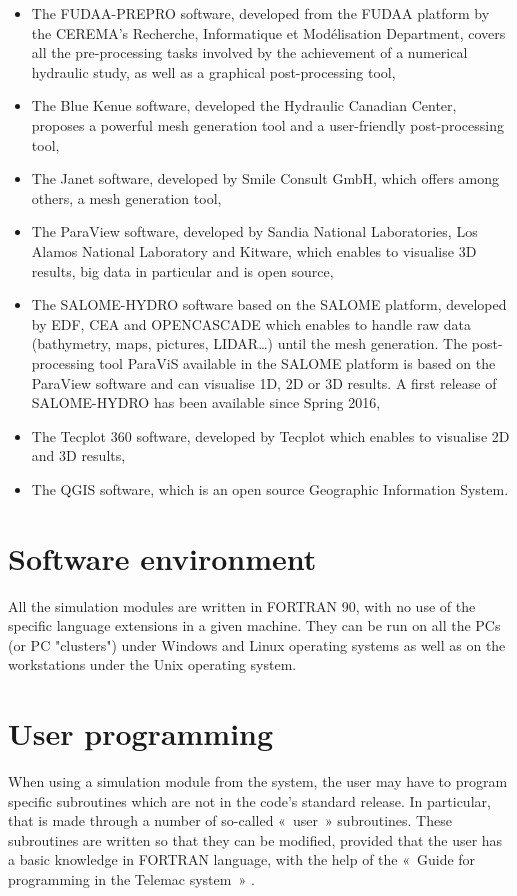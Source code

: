 \begin{itemize}
\item The FUDAA-PREPRO software, developed from the FUDAA platform
by the CEREMA's Recherche, Informatique et Modélisation Department, covers all
the pre-processing tasks involved by the achievement of a numerical hydraulic
study, as well as a graphical post-processing tool,
\item The Blue Kenue software, developed the Hydraulic Canadian
Center, proposes a powerful mesh generation tool and a user-friendly
post-processing tool,
\item The Janet software, developed by Smile Consult GmbH, which offers among
others, a mesh generation tool,
\item The ParaView software, developed by Sandia National Laboratories, Los
Alamos National Laboratory and Kitware, which enables to visualise 3D results,
big data in particular and is open source,
\item The SALOME-HYDRO software based on the SALOME platform, developed by EDF,
CEA and OPENCASCADE which enables to handle raw data (bathymetry, maps,
pictures, LIDAR\ldots) until the mesh generation.
The post-processing tool ParaViS available in the SALOME platform is based on
the ParaView software and can visualise 1D, 2D or 3D results.
A first release of SALOME-HYDRO has been available since Spring 2016,
\item The Tecplot 360 software, developed by Tecplot which enables to visualise
2D and 3D results,
\item The QGIS software, which is an open source Geographic Information System.
\end{itemize}


\section{Software environment}

All the simulation modules are written in FORTRAN 90, with no use of the
specific language extensions in a given machine. They can be run on all the PCs
(or PC "clusters") under Windows and Linux operating systems as well as on the
workstations under the Unix operating system.

\section{User programming}

When using a simulation module from the \tel system, the user may have to
program specific subroutines which are not in the code's standard release. In
particular, that is made through a number of so-called «~user~» subroutines.
These subroutines are written so that they can be modified, provided that the
user has a basic knowledge in FORTRAN language, with the help of the «~Guide
for programming in the Telemac system~» \cite{HervouetProg2009}.

